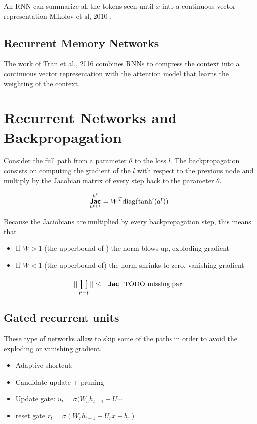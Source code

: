 \documentclass[b5paper]{report}
\begin{document}
An RNN can summarize all the tokens seen until $x$ into a continuous vector
representation Mikolov et al, 2010 \cite{mikolov2010recurrent}.

\subsection{Recurrent Memory Networks}

The work of Tran et al., 2016 \cite{tran2016recurrent} combines RNNs to compress the context into a
continuous vector representation with the attention model that learns the
weighting of the context.

\section{Recurrent Networks and Backpropagation}

Consider the full path from a parameter $\theta$ to the loss $l$. The
backpropagation consists on computing the gradient of the $l$ with respect to
the previous node and multiply by the Jacobian matrix of every step back to the
parameter $\theta$.

\begin{equation}
  \operatorname*{\bm{\mathsf{Jac}}}_{h^{t+1}}^{h^t} = W^T \text{diag}(\tanh'(a^t))
\end{equation}

Because the Jaciobians are multiplied by every backpropagation step, this means
that

\begin{itemize}
  \item If $W > 1$ (the upperbound of ) the norm blows up, exploding gradient
  \item If $W < 1$ (the upperbound of) the norm shrinks to zero, vanishing
    gradient
\end{itemize}

\begin{equation}
  || \prod_{t'=t}^{} || \le  || \operatorname*{\bm{\mathsf{Jac}}} || \text{TODO missing part}
\end{equation}

\subsection{Gated recurrent units}

These type of networks allow to skip some of the paths in order to avoid the
exploding or vanishing gradient.

\begin{itemize}
  \item Adaptive shortcut:
  \item Candidate update + pruning
  \item Update gate: $u_t = \sigma(W_uh_{t-1} + U \cdots$
  \item reset gate $r_t = \sigma(W_rh_{t-1} + U_rx + b_r)$
\end{itemize}
\end{document}

